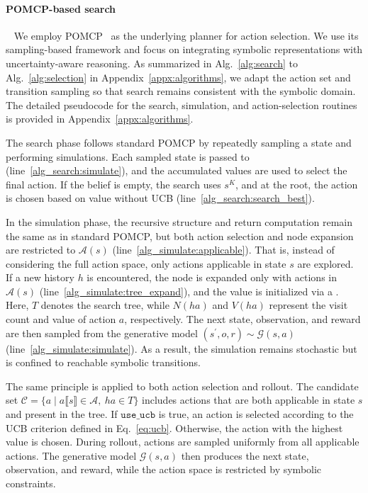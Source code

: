 \paragraph{POMCP-based search}~\label{methd:POMCP}
We employ POMCP~\cite{silver2010monte} as the underlying planner for action selection. We use its sampling-based framework and focus on integrating symbolic representations with uncertainty-aware reasoning. As summarized in Alg.~\ref{alg:search} to Alg.~\ref{alg:selection} in Appendix~\ref{appx:algorithms}, we adapt the action set and transition sampling so that search remains consistent with the symbolic domain. The detailed pseudocode for the search, simulation, and action-selection routines is provided in Appendix~\ref{appx:algorithms}.

The search phase follows standard POMCP by repeatedly sampling a state and performing simulations. Each sampled state is passed to \Simulate (line~\ref{alg_search:simulate}), and the accumulated values are used to select the final action. If the belief is empty, the search uses $s^{K}$, and at the root, the action is chosen based on value without UCB (line~\ref{alg_search:search_best}).


In the simulation phase, the recursive structure and return computation remain the same as in standard POMCP, but both action selection and node expansion are restricted to $\mathcal{A}(s)$ (line~\ref{alg_simulate:applicable}). That is, instead of considering the full action space, only actions applicable in state $s$ are explored. If a new history $h$ is encountered, the node is expanded only with actions in $\mathcal{A}(s)$ (line~\ref{alg_simulate:tree_expand}), and the value is initialized via a \Rollout. Here, $T$ denotes the search tree, while $N(ha)$ and $V(ha)$ represent the visit count and value of action $a$, respectively. The next state, observation, and reward are then sampled from the generative model $(s^\prime, o, r) \sim \mathcal{G}(s,a)$ (line~\ref{alg_simulate:simulate}). As a result, the simulation remains stochastic but is confined to reachable symbolic transitions.

The same principle is applied to both action selection and rollout. The candidate set $\mathcal{C} = \{a \mid a\llbracket s \rrbracket \in \mathcal{A},\ ha \in T\}$ includes actions that are both applicable in state $s$ and present in the tree. If $\texttt{use\_ucb}$ is true, an action is selected according to the UCB criterion defined in Eq.~\ref{eq:ucb}. Otherwise, the action with the highest value is chosen. During rollout, actions are sampled uniformly from all applicable actions. The generative model $\mathcal{G}(s,a)$ then produces the next state, observation, and reward, while the action space is restricted by symbolic constraints.

